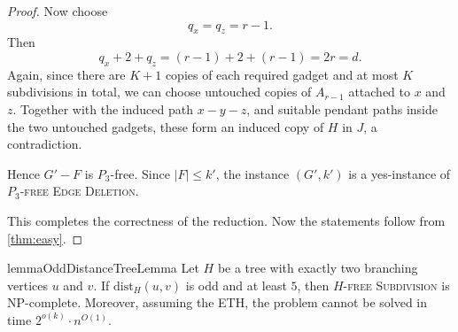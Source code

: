 \documentclass[a4paper,UKenglish,cleveref, autoref, thm-restate]{lipics-v2021}
\newcommand{\dist}{\mathrm{dist}}
\begin{document}
\begin{proof}
Now choose
\[
    q_x=q_z=r-1.
\]
Then
\[
    q_x+2+q_z=(r-1)+2+(r-1)=2r=d.
\]
Again, since there are $K+1$ copies of each required gadget and at most $K$
subdivisions in total, we can choose untouched copies of $A_{r-1}$ attached to
$x$ and $z$.  Together with the induced path $x-y-z$, and suitable pendant
paths inside the two untouched gadgets, these form an induced copy of $H$ in
$J$, a contradiction.

Hence $G'-F$ is $P_3$-free.  Since $|F|\leq k'$, the instance $(G',k')$ is a
yes-instance of \textsc{$P_3$-free Edge Deletion}.

This completes the correctness of the reduction.
Now the statements follow from \cref{thm:easy}.
\end{proof}


\begin{restatable}{lemma}{OddDistanceTreeLemma}
\label{lem:tree-odd-distance-large}
Let $H$ be a tree with exactly two branching vertices $u$ and $v$.
If $\dist_H(u,v)$ is odd and at least $5$, then
\textsc{$H$-free Subdivision} is \textsf{NP}-complete.
Moreover, assuming the ETH, the problem cannot be solved in time
$2^{o(k)}\cdot n^{O(1)}$.
\end{restatable}
\end{document}

